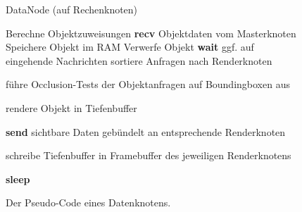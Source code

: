\begin{figure}[ttt!]
\centering
 \begin{minipage}[t]{12.5cm}
\begin{algorithm}[H]
  \caption{DataNode (auf Rechenknoten)\label{alg:impl:datanode}} 
    \begin{algorithmic} [1]
      \STATE Berechne Objektzuweisungen
      \STATE \textbf{recv} Objektdaten vom Masterknoten
	\STATE Speichere Objekt im RAM
      \ELSE
	\STATE Verwerfe Objekt
      \ENDIF
	\STATE \textbf{wait} ggf. auf eingehende Nachrichten
	  \STATE sortiere Anfragen nach Renderknoten
	    \STATE \begin{flushleft}führe Occlusion-Tests der Objektanfragen auf Boundingboxen aus\end{flushleft}
	  \ENDFOR
	    \STATE rendere Objekt in Tiefenbuffer
 	  \ENDFOR
	  \STATE \begin{flushleft}\textbf{send} sichtbare Daten gebündelt an entsprechende Renderknoten\end{flushleft}
	  \STATE \begin{flushleft}schreibe Tiefenbuffer in Framebuffer des jeweiligen Renderknotens\end{flushleft}
	\ELSE \STATE\textbf{sleep}
	\ENDIF
      \ENDWHILE
    \end{algorithmic}
\end{algorithm}
 \end{minipage}
\caption{\label{fig:impl:datanode}Der Pseudo-Code eines Datenknotens.}
\end{figure}


